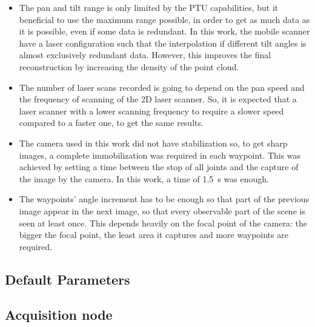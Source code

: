 \begin{itemize}
        
    \item The pan and tilt range is only limited by the PTU capabilities, but it beneficial to use the maximum range possible, in order to get as much data as it is possible, even if some data is redundant. In this work, the mobile scanner have a laser configuration such that the interpolation if different tilt angles is almost exclusively redundant data. However, this improves the final reconstruction by increasing the density of the point cloud.
                    
    \item The number of laser scans recorded is going to depend on the pan speed and the frequency of scanning of the 2D laser scanner. So, it is expected that a laser scanner with a lower scanning frequency to require a slower speed compared to a faster one, to get the same results. 
                        
    \item The camera used in this work did not have stabilization so, to get sharp images, a complete immobilization was required in each waypoint. This was achieved by setting a time between the stop of all joints and the capture of the image by the camera. In this work, a time of \SI{1.5}{\second} was enough.
                        
    \item The waypoints' angle increment has to be enough so that part of the previous image appear in the next image, so that every observable part of the scene is seen at least once. This depends heavily on the focal point of the camera: the bigger the focal point, the least area it captures and more waypoints are required.
                    
\end{itemize}

\subsection{Default Parameters}
\label{section:acquisition-default-parameters}

\subsection{Acquisition node}
\label{section:acquisition-node}


